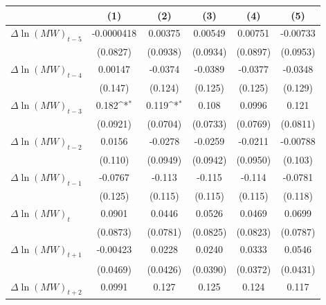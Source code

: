 {
\def\sym#1{\ifmmode^{#1}\else\(^{#1}\)\fi}
\begin{tabular}{l*{5}{c}}
\hline\hline
          &\multicolumn{1}{c}{(1)}         &\multicolumn{1}{c}{(2)}         &\multicolumn{1}{c}{(3)}         &\multicolumn{1}{c}{(4)}         &\multicolumn{1}{c}{(5)}         \\
\hline
$\Delta \ln(MW)_{t-5}$&-0.0000418         &  0.00375         &  0.00549         &  0.00751         & -0.00733         \\
          & (0.0827)         & (0.0938)         & (0.0934)         & (0.0897)         & (0.0953)         \\
[1em]
$\Delta \ln(MW)_{t-4}$&  0.00147         &  -0.0374         &  -0.0389         &  -0.0377         &  -0.0348         \\
          &  (0.147)         &  (0.124)         &  (0.125)         &  (0.125)         &  (0.129)         \\
[1em]
$\Delta \ln(MW)_{t-3}$&    0.182\sym{*}  &    0.119\sym{*}  &    0.108         &   0.0996         &    0.121         \\
          & (0.0921)         & (0.0704)         & (0.0733)         & (0.0769)         & (0.0811)         \\
[1em]
$\Delta \ln(MW)_{t-2}$&   0.0156         &  -0.0278         &  -0.0259         &  -0.0211         & -0.00788         \\
          &  (0.110)         & (0.0949)         & (0.0942)         & (0.0950)         &  (0.103)         \\
[1em]
$\Delta \ln(MW)_{t-1}$&  -0.0767         &   -0.113         &   -0.115         &   -0.114         &  -0.0781         \\
          &  (0.125)         &  (0.115)         &  (0.115)         &  (0.115)         &  (0.118)         \\
[1em]
$\Delta \ln(MW)_{t}$&   0.0901         &   0.0446         &   0.0526         &   0.0469         &   0.0699         \\
          & (0.0873)         & (0.0781)         & (0.0825)         & (0.0823)         & (0.0787)         \\
[1em]
$\Delta \ln(MW)_{t+1}$& -0.00423         &   0.0228         &   0.0240         &   0.0333         &   0.0546         \\
          & (0.0469)         & (0.0426)         & (0.0390)         & (0.0372)         & (0.0431)         \\
[1em]
$\Delta \ln(MW)_{t+2}$&   0.0991         &    0.127         &    0.125         &    0.124         &    0.117         \\

\end{tabular}}
